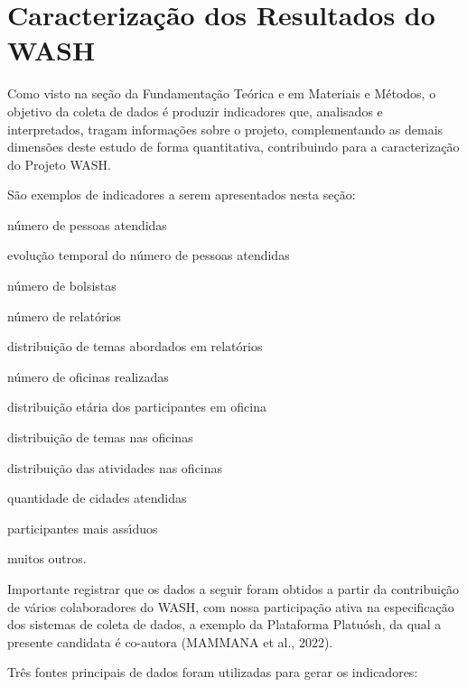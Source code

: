 \documentclass[
12pt,		%
openright,	%
twoside,  %
a4paper,			%
chapter=TITLE,		%
english,			%
french,				%
spanish,			%
brazil				%
]{USPSC-classe/USPSC}
\begin{document}
\section[Caracteriza\c{c}\~ao dos Resultados do WASH]{Caracteriza\c{c}\~ao dos Resultados do WASH}\label{Caracteriza\c{c}\~ao dos Resultados do WASH}
Como visto na se\c{c}\~ao da Fundamenta\c{c}\~ao Te\'orica e em Materiais e M\'etodos, o objetivo da coleta de dados \'e produzir indicadores que, analisados e interpretados, tragam informa\c{c}\~oes sobre o projeto, complementando as demais dimens\~oes deste estudo de forma quantitativa, contribuindo para a caracteriza\c{c}\~ao do Projeto WASH.


S\~ao exemplos de indicadores a serem apresentados nesta se\c{c}\~ao:



\begin{alineas}
\item n\'umero de pessoas atendidas
\item evolu\c{c}\~ao temporal do n\'umero de pessoas atendidas
\item n\'umero de bolsistas
\item n\'umero de relat\'orios
\item distribui\c{c}\~ao de temas abordados em relat\'orios
\item n\'umero de oficinas realizadas
\item distribui\c{c}\~ao et\'aria dos participantes em oficina
\item distribui\c{c}\~ao de temas nas oficinas
\item distribui\c{c}\~ao das atividades nas oficinas
\item quantidade de cidades atendidas
\item participantes mais ass\'{\i}duos
\item muitos outros.
\end{alineas}

Importante registrar que os dados a seguir foram obtidos a partir da contribui\c{c}\~ao de v\'arios colaboradores do WASH, com nossa participa\c{c}\~ao ativa na especifica\c{c}\~ao dos sistemas de coleta de dados, a exemplo da Plataforma Platu\'osh, da qual a presente candidata \'e co-autora  (MAMMANA et al., 2022).


Tr\^es fontes principais de dados foram utilizadas para gerar os indicadores:
\end{document}
